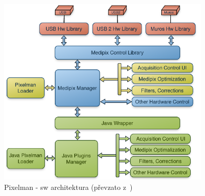 \begin{figure}[th!]
	\begin{center}
		\includegraphics[width=10.25cm]{figures/pixelman.png}
		\caption{Pixelman - sw architektura (převzato z~\cite{pixelman})}
		\label{fig:det:pixelman}
	\end{center}
\end{figure}










